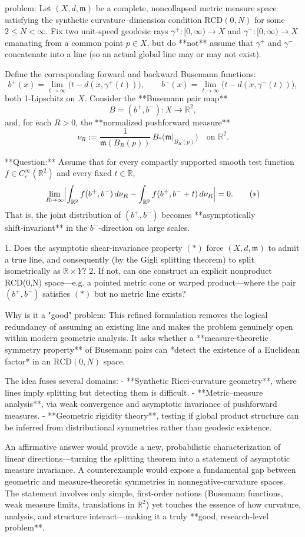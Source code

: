 problem:  
Let \((X,d,\mathfrak{m})\) be a complete, noncollapsed metric measure space satisfying the synthetic curvature–dimension condition \(\mathrm{RCD}(0,N)\) for some \(2\le N<\infty\).  
Fix two unit-speed geodesic rays \(\gamma^+:[0,\infty)\to X\) and \(\gamma^-:[0,\infty)\to X\) emanating from a common point \(p\in X\), but do **not** assume that \(\gamma^+\) and \(\gamma^-\) concatenate into a line (so an actual global line may or may not exist).  

Define the corresponding forward and backward Busemann functions:
\[
b^+(x)=\lim_{t\to\infty}\bigl(t-d(x,\gamma^+(t))\bigr),\qquad  
b^-(x)=\lim_{t\to\infty}\bigl(t-d(x,\gamma^-(t))\bigr),
\]
both 1‑Lipschitz on \(X\).  
Consider the **Busemann pair map**
\[
B=(b^+,b^-):X\longrightarrow\mathbb{R}^2,
\]
and, for each \(R>0\), the **normalized pushforward measure**
\[
\nu_R := \frac{1}{\mathfrak{m}(B_R(p))}\,B_*\bigl(\mathfrak{m}|_{B_R(p)}\bigr)
\quad\text{on }\mathbb{R}^2.
\]

**Question:**  
Assume that for every compactly supported smooth test function \(f\in C_c^\infty(\mathbb{R}^2)\) and every fixed \(t\in\mathbb{R}\),
\[
\lim_{R\to\infty}
\Bigl|\int_{\mathbb{R}^2} f(b^+,b^-)\,d\nu_R
-\int_{\mathbb{R}^2} f(b^+,b^-+t)\,d\nu_R\Bigr|=0.
\tag{\(*\)}
\]
That is, the joint distribution of \((b^+,b^-)\) becomes **asymptotically shift‑invariant** in the \(b^-\)-direction on large scales.

1. Does the asymptotic shear‑invariance property \((*)\) force \((X,d,\mathfrak{m})\) to admit a true line, and consequently (by the Gigli splitting theorem) to split isometrically as \(\mathbb{R}\times Y\)?  
2. If not, can one construct an explicit nonproduct RCD(0,N) space—e.g. a pointed metric cone or warped product—where the pair \((b^+,b^-)\) satisfies \((*)\) but no metric line exists?

Why is it a "good" problem:  
This refined formulation removes the logical redundancy of assuming an existing line and makes the problem genuinely open within modern geometric analysis. It asks whether a **measure‑theoretic symmetry property** of Busemann pairs can *detect the existence of a Euclidean factor* in an \(\mathrm{RCD}(0,N)\) space.  

The idea fuses several domains:
- **Synthetic Ricci‑curvature geometry**, where lines imply splitting but detecting them is difficult.  
- **Metric–measure analysis**, via weak convergence and asymptotic invariance of pushforward measures.  
- **Geometric rigidity theory**, testing if global product structure can be inferred from distributional symmetries rather than geodesic existence.

An affirmative answer would provide a new, probabilistic characterization of linear directions—turning the splitting theorem into a statement of asymptotic measure invariance.  
A counterexample would expose a fundamental gap between geometric and measure‑theoretic symmetries in nonnegative‑curvature spaces.  
The statement involves only simple, first‑order notions (Busemann functions, weak measure limits, translations in \(\mathbb{R}^2\)) yet touches the essence of how curvature, analysis, and structure interact—making it a truly **good, research‑level problem**.